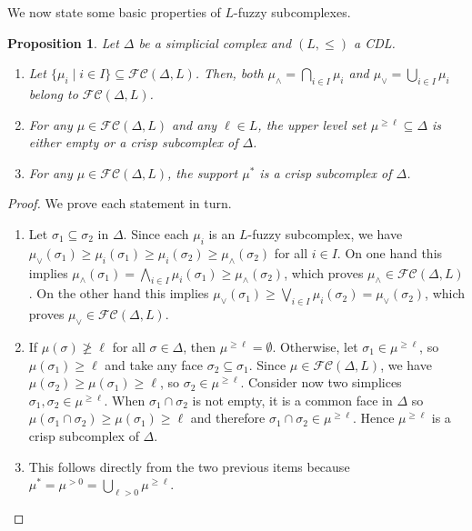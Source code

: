 \documentclass[a4paper,10pt]{article}
\newtheorem{proposition}[theorem]{Proposition}
\newcommand{\calfc}{\mathcal{FC}}
\begin{document}
We now state some basic properties of \(L\)-fuzzy subcomplexes.

\begin{proposition}
\label{prop:subcomplexesproperties}
Let \(\Delta\) be a simplicial complex and \((L,\leq)\) a CDL.
\begin{enumerate}
\item Let \(\{\mu_i \mid i \in I\} \subseteq \calfc(\Delta,L)\). Then, both \(\mu_{\wedge} = \bigcap_{i\in I} \mu_i\) and \(\mu_{\vee} = \bigcup_{i\in I} \mu_i\) belong to \(\calfc(\Delta,L)\).
\item For any \(\mu \in \calfc(\Delta,L)\) and any \(\ell \in L\), the upper level set \(\mu^{\geq \ell} \subseteq \Delta\) is either empty or a crisp subcomplex of \(\Delta\).
\item For any \(\mu \in \calfc(\Delta,L)\), the support \(\mu^*\) is a crisp subcomplex of \(\Delta\).
\end{enumerate}
\end{proposition}

\begin{proof}
We prove each statement in turn.
\begin{enumerate}
\item Let \(\sigma_1 \subseteq \sigma_2\) in \(\Delta\). Since each \(\mu_i\) is an \(L\)-fuzzy subcomplex, we have 
\(\mu_{\vee}(\sigma_1) \geq \mu_i(\sigma_1) \geq \mu_i(\sigma_2) \geq \mu_{\wedge}(\sigma_2)\) for all \(i \in I\). On one hand this implies \(\mu_{\wedge}(\sigma_1) =\bigwedge_{i \in I} \mu_i(\sigma_1) \geq \mu_{\wedge}(\sigma_2)\), which proves \(\mu_{\wedge} \in \calfc(\Delta,L)\). On the other hand this implies \(\mu_{\vee}(\sigma_1) \geq  \bigvee_{i \in I} \mu_i(\sigma_2)=\mu_{\vee}(\sigma_2)\), which proves \(\mu_{\vee} \in \calfc(\Delta,L)\). 
\item If \(\mu(\sigma) \not \geq \ell\) for all \(\sigma \in \Delta\), then \(\mu^{\geq \ell} = \emptyset\). Otherwise, let \(\sigma_1 \in \mu^{\geq \ell}\), so \(\mu(\sigma_1) \geq \ell\) and take any face \(\sigma_2 \subseteq \sigma_1\). Since \(\mu \in \calfc(\Delta,L)\), we have \(\mu(\sigma_2) \geq \mu(\sigma_1) \geq \ell\), so \(\sigma_2 \in \mu^{\geq \ell}\). Consider now two simplices \(\sigma_1, \sigma_2 \in \mu^{\geq \ell}\). When \(\sigma_1 \cap \sigma_2\) is not empty, it is a common face in \(\Delta\) so \(\mu(\sigma_1 \cap \sigma_2) \geq \mu(\sigma_1) \geq \ell\) and therefore \(\sigma_1 \cap \sigma_2 \in \mu^{\geq \ell}\). Hence \(\mu^{\geq \ell}\) is a crisp subcomplex of \(\Delta\).
\item This follows directly from the two previous items because \(\mu^*=\mu^{>0}=\bigcup_{\ell>0} \mu^{\geq \ell}\).
\qedhere
\end{enumerate}
\end{proof}
\end{document}
